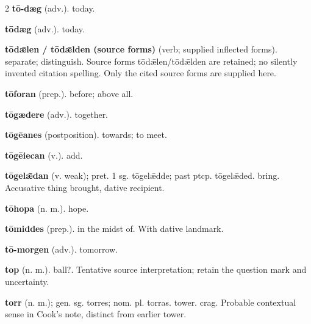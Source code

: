 \begin{multicols*}{2}
\textbf{tō-dæg} (adv.). today.\par
\textbf{tōdæg} (adv.). today.\par
\textbf{tōdǣlen / tōdǣlden (source forms)} (verb; supplied inflected forms). separate; distinguish. Source forms tōdǣlen/tōdǣlden are retained; no silently invented citation spelling. Only the cited source forms are supplied here.\par
\textbf{tōforan} (prep.). before; above all.\par
\textbf{tōgædere} (adv.). together.\par
\textbf{tōgēanes} (postposition). towards; to meet.\par
\textbf{tōgēiecan} (v.). add.\par
\textbf{tōgelǣdan} (v. weak); pret. 1 sg. tōgelǣdde; past ptcp. tōgelǣded. bring. Accusative thing brought, dative recipient.\par
\textbf{tōhopa} (n. m.). hope.\par
\textbf{tōmiddes} (prep.). in the midst of. With dative landmark.\par
\textbf{tō-morgen} (adv.). tomorrow.\par
\textbf{top} (n. m.). ball?. Tentative source interpretation; retain the question mark and uncertainty.\par
\textbf{torr} (n. m.); gen. sg. torres; nom. pl. torras. tower. crag. Probable contextual sense in Cook's note, distinct from earlier tower.\par

\end{multicols*}
